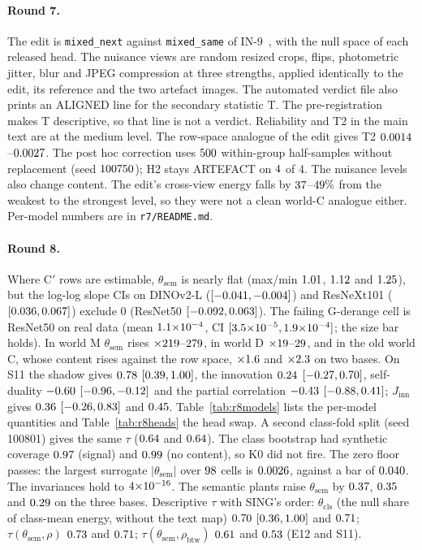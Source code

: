 \documentclass[10pt]{article}
\begin{document}
\paragraph{Round 7.} The edit is \texttt{mixed\_next} against \texttt{mixed\_same} of IN-9~\citep{xiao2021backgrounds}, with the null space of each released head. The nuisance views are random resized crops, flips, photometric jitter, blur and JPEG compression at three strengths, applied identically to the edit, its reference and the two artefact images. The automated verdict file also prints an ALIGNED line for the secondary statistic T. The pre-registration makes T descriptive, so that line is not a verdict. Reliability and T2 in the main text are at the medium level. The row-space analogue of the edit gives T2 $0.0014$--$0.0027$. The post hoc correction uses $500$ within-group half-samples without replacement (seed $100750$); H2 stays ARTEFACT on $4$ of 4. The nuisance levels also change content. The edit's cross-view energy falls by $37$--$49\%$ from the weakest to the strongest level, so they were not a clean world-C analogue either. Per-model numbers are in \texttt{r7/README.md}.
\paragraph{Round 8.} Where C$'$ rows are estimable, $\theta_{\mathrm{sem}}$ is nearly flat (max/min $1.01$, $1.12$ and $1.25$), but the log-log slope CIs on DINOv2-L ($[{-}0.041, {-}0.004]$) and ResNeXt101 ($[0.036, 0.067]$) exclude 0 (ResNet50 $[{-}0.092, 0.063]$). The failing G-derange cell is ResNet50 on real data (mean $1.1{\times}10^{-4}$, CI $[3.5{\times}10^{-5},1.9{\times}10^{-4}]$; the size bar holds). In world M $\theta_{\mathrm{sem}}$ rises ${\times}219$--$279$, in world D ${\times}19$--$29$, and in the old world C, whose content rises against the row space, ${\times}1.6$ and ${\times}2.3$ on two bases. On S11 the shadow gives $0.78$ $[0.39,1.00]$, the innovation $0.24$ $[{-}0.27,0.70]$, self-duality ${-}0.60$ $[{-}0.96,{-}0.12]$ and the partial correlation ${-}0.43$ $[{-}0.88,0.41]$; $J_{\mathrm{inn}}$ gives $0.36$ $[{-}0.26,0.83]$ and $0.45$. Table~\ref{tab:r8models} lists the per-model quantities and Table~\ref{tab:r8heads} the head swap. A second class-fold split (seed 100801) gives the same $\tau$ ($0.64$ and $0.64$). The class bootstrap had synthetic coverage $0.97$ (signal) and $0.99$ (no content), so K0 did not fire. The zero floor passes: the largest surrogate $|\theta_{\mathrm{sem}}|$ over $98$ cells is $0.0026$, against a bar of $0.040$. The invariances hold to $4{\times}10^{-16}$. The semantic plants raise $\theta_{\mathrm{sem}}$ by $0.37$, $0.35$ and $0.29$ on the three bases. Descriptive $\tau$ with SING's order: $\theta_{\mathrm{cls}}$ (the null share of class-mean energy, without the text map) $0.70$ $[0.36,1.00]$ and $0.71$; $\tau(\theta_{\mathrm{sem}},\rho)$ $0.73$ and $0.71$; $\tau(\theta_{\mathrm{sem}},\rho_{\mathrm{btw}})$ $0.61$ and $0.53$ (E12 and S11).
\end{document}
